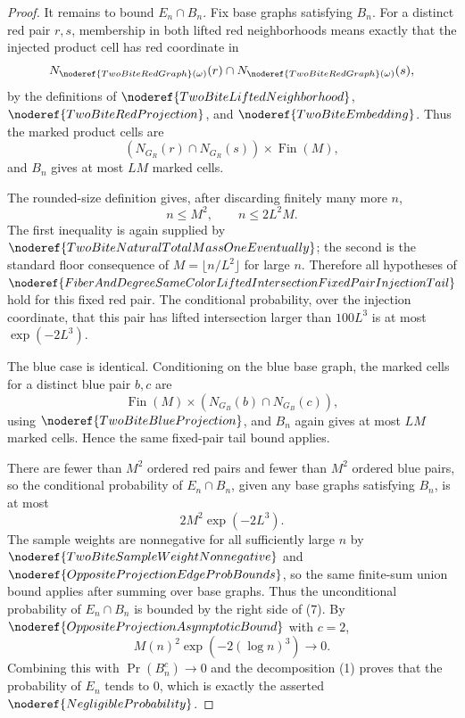 \begin{proof}
It remains to bound \(E_n\cap B_n\).  Fix base graphs satisfying \(B_n\).
For a distinct red pair \(r,s\), membership in both lifted red neighborhoods
means exactly that the injected product cell has red coordinate in
\[
N_{\noderef{TwoBiteRedGraph}(\omega)}(r)\cap
N_{\noderef{TwoBiteRedGraph}(\omega)}(s),
\]
by the definitions of \(\noderef{TwoBiteLiftedNeighborhood}\),
\(\noderef{TwoBiteRedProjection}\), and \(\noderef{TwoBiteEmbedding}\).
Thus the marked product cells are
\[
(N_{G_R}(r)\cap N_{G_R}(s))\times\operatorname{Fin}(M),
\]
and \(B_n\) gives at most \(LM\) marked cells.

The rounded-size definition gives, after discarding finitely many more \(n\),
\[
n\le M^2,\qquad n\le 2L^2M.
\tag{6}
\]
The first inequality is again supplied by
\(\noderef{TwoBiteNaturalTotalMassOneEventually}\); the second is the
standard floor consequence of
\(M=\lfloor n/L^2\rfloor\) for large \(n\).  Therefore all hypotheses of
\(\noderef{FiberAndDegreeSameColorLiftedIntersectionFixedPairInjectionTail}\)
hold for this fixed red pair.  The conditional probability, over the
injection coordinate, that this pair has lifted intersection larger than
\(100L^3\) is at most \(\exp(-2L^3)\).

The blue case is identical.  Conditioning on the blue base graph, the marked
cells for a distinct blue pair \(b,c\) are
\[
\operatorname{Fin}(M)\times (N_{G_B}(b)\cap N_{G_B}(c)),
\]
using \(\noderef{TwoBiteBlueProjection}\), and \(B_n\) again gives at most
\(LM\) marked cells.  Hence the same fixed-pair tail bound applies.

There are fewer than \(M^2\) ordered red pairs and fewer than \(M^2\) ordered
blue pairs, so the conditional probability of \(E_n\cap B_n\), given any
base graphs satisfying \(B_n\), is at most
\[
2M^2\exp(-2L^3).
\tag{7}
\]
The sample weights are nonnegative for all sufficiently large \(n\) by
\(\noderef{TwoBiteSampleWeightNonnegative}\) and
\(\noderef{OppositeProjectionEdgeProbBounds}\), so the same finite-sum union
bound applies after summing over base graphs.  Thus the unconditional
probability of \(E_n\cap B_n\) is bounded by the right side of (7).
By \(\noderef{OppositeProjectionAsymptoticBound}\) with \(c=2\),
\[
M(n)^2\exp(-2(\log n)^3)\to0.
\]
Combining this with \(\Pr(B_n^c)\to0\) and the decomposition (1) proves that
the probability of \(E_n\) tends to \(0\), which is exactly the asserted
\(\noderef{NegligibleProbability}\).
\end{proof}
